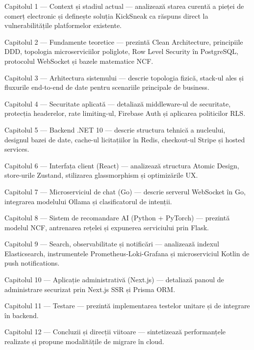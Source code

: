 Capitolul 1 --- Context și stadiul actual --- analizează starea curentă a pieței de comerț electronic și definește soluția KickSneak ca răspuns direct la vulnerabilitățile platformelor existente.

Capitolul 2 --- Fundamente teoretice --- prezintă Clean Architecture, principiile DDD, topologia microserviciilor poliglote, Row Level Security în PostgreSQL, protocolul WebSocket și bazele matematice NCF.

Capitolul 3 --- Arhitectura sistemului --- descrie topologia fizică, stack-ul ales și fluxurile end-to-end de date pentru scenariile principale de business.

Capitolul 4 --- Securitate aplicată --- detaliază middleware-ul de securitate, protecția headerelor, rate limiting-ul, Firebase Auth și aplicarea politicilor RLS.

Capitolul 5 --- Backend .NET 10 --- descrie structura tehnică a nucleului, designul bazei de date, cache-ul licitațiilor în Redis, checkout-ul Stripe și hosted services.

Capitolul 6 --- Interfața client (React) --- analizează structura Atomic Design, store-urile Zustand, stilizarea glassmorphism și optimizările UX.

Capitolul 7 --- Microserviciul de chat (Go) --- descrie serverul WebSocket în Go, integrarea modelului Ollama și clasificatorul de intenții.

Capitolul 8 --- Sistem de recomandare AI (Python + PyTorch) --- prezintă modelul NCF, antrenarea rețelei și expunerea serviciului prin Flask.

Capitolul 9 --- Search, observabilitate și notificări --- analizează indexul Elasticsearch, instrumentele Prometheus-Loki-Grafana și microserviciul Kotlin de push notifications.

Capitolul 10 --- Aplicație administrativă (Next.js) --- detaliază panoul de administrare securizat prin Next.js SSR și Prisma ORM.

Capitolul 11 --- Testare --- prezintă implementarea testelor unitare și de integrare în backend.

Capitolul 12 --- Concluzii și direcții viitoare --- sintetizează performanțele realizate și propune modalitățile de migrare în cloud.
